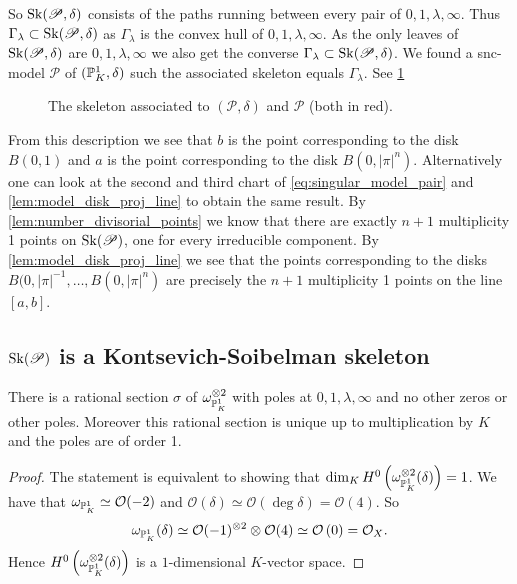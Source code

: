 So $\operatorname{Sk}(\mathscr P, \delta)$ consists of the paths running between every pair of $0, 1, \lambda, \infty$. Thus $\Gamma_\lambda \subset \operatorname{Sk}(\mathscr P, \delta)$ as $\Gamma_\lambda$ is the convex hull of $0, 1, \lambda, \infty$.
As  the only leaves of $\operatorname{Sk}(\mathscr P, \delta)$ are $0, 1, \lambda, \infty$ we also get the converse $\Gamma_\lambda \subset  \operatorname{Sk}(\mathscr P, \delta)$. 
We found a snc-model $\mathscr P$ of $(\mathbb{P}^{1}_K, \delta)$ such the associated skeleton equals $\Gamma_\lambda$. 
See \cref{fig:skeleton_of_the_pair}

\begin{figure}[ht]
    \centering
    \caption{The skeleton associated to $(\mathscr P, \delta)$ and $\mathscr P$ (both in red).}
    \label{fig:skeleton_of_the_pair}
\end{figure}

From this description we see that $b$ is the point corresponding to the disk $B(0, 1)$ and $a$ is the point corresponding to the disk $B(0, |\pi|^{n})$. 
Alternatively one can look at the second and third chart of \cref{eq:singular_model_pair} and \cref{lem:model_disk_proj_line} to obtain the same result. 
By \cref{lem:number_divisorial_points} we know that there are exactly $n + 1$ multiplicity 1 points on $\operatorname{Sk}(\mathscr P)$, one for every irreducible component.
By \cref{lem:model_disk_proj_line} we see that the points corresponding to the disks $B(0, |\pi|^{-1}, \ldots, B(0, |\pi|^{n})$ are precisely the $n + 1$ multiplicity 1 points on the line $[a, b]$. 

\subsection{$\operatorname{Sk}(\mathscr P)$ is a Kontsevich-Soibelman skeleton} \label{sec:sk_P_is_a_kontsevich-soibelman_skeleton}

\begin{lemma}\label{lem:unique_form_pair}
	There is a rational section $\sigma$ of $\omega_{\mathbb{P}^{1}_K}^{\otimes 2}$ with poles at  $0, 1, \lambda, \infty$ and no other zeros or other poles. 
	Moreover this rational section is unique up to multiplication by $K$ and the poles are of order 1. 
\end{lemma}
\begin{proof}
	The statement is equivalent to showing that $\dim_K H^{0}\left(\omega_{\mathbb{P}^{1}_K}^{\otimes 2}(\delta)\right)  = 1$.
	We have that $\omega_{\mathbb{P}^{1}_K} \simeq \mathcal{O}(-2)$ and $\mathcal{O}(\delta) \simeq \mathcal{O}(\deg \delta) = \mathcal{O}(4)$.
	So \[
		\omega_{\mathbb{P}^{1}_K} (\delta) \simeq \mathcal{O}(-1)^{\otimes 2} \otimes \mathcal{O}(4) \simeq \mathcal{O}\left(0 \right)  = \mathcal{O}_X
	.\] 
	Hence $H^{0}\left(\omega_{\mathbb{P}^{1}_K}^{\otimes 2}(\delta)\right)$ is a $1$-dimensional $K$-vector space. 
\end{proof}


